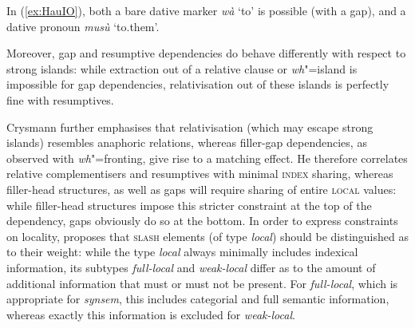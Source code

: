 \documentclass[output=paper
                ,modfonts
                ,nonflat
	        ,collection
	        ,collectionchapter
	        ,collectiontoclongg
 	        ,biblatex
                ,babelshorthands
                ,newtxmath
                ,draftmode
                ,colorlinks, citecolor=brown
]{./langsci/langscibook}
\begin{document}
{\begin{exe}
  \ex \label{ex:HauIO}
  \begin{xlist}
     
  \end{xlist}
\end{exe}


\noindent
In (\ref{ex:HauIO}), both a bare dative marker \textit{wà} `to' is possible (with a gap), and a dative pronoun \textit{musù} `to.them'.

Moreover, gap and resumptive dependencies do behave differently with respect to strong islands: while extraction out of a relative clause or \emph{wh}"=island is impossible for gap dependencies, relativisation out of these islands is perfectly fine with resumptives. 

\begin{exe}
   \label{ex:HauResLongIO}
\end{exe}

\noindent
Crysmann further emphasises that relativisation (which may escape
strong islands) resembles anaphoric relations, whereas filler-gap
dependencies, as observed with \emph{wh}"=fronting, give rise to a matching
effect. He therefore correlates relative complementisers and
resumptives with minimal \textsc{index} sharing, whereas filler-head
structures, as well as gaps will require sharing of entire
\textsc{local} values: while filler-head structures impose this
stricter constraint at the top of the dependency, gaps obviously do so
at the bottom. In order to express constraints on locality,
\citet{Crysmann:12} proposes that \textsc{slash} elements (of type
\textit{local}) should be distinguished as to their weight: while the
type \textit{local} always minimally includes indexical information,
its subtypes \textit{full-local} and \textit{weak-local} differ as to
the amount of additional information that must or must not be
present. For \textit{full-local}, which is appropriate for
\textit{synsem}, this includes categorial and full semantic
information, whereas exactly this information is excluded for
\textit{weak-local}.



}
\end{document}
